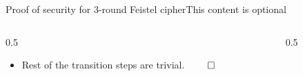 \ifdefined\PRESENTATION\else\PassOptionsToClass{handout}{beamer}\fi\documentclass[aspectratio=169, lualatex]{beamer}
\begin{document}
	\begin{frame}{Proof of security for 3-round Feistel cipher}{This content is optional}
		\begin{columns}[c]
			\begin{column}{0.5\textwidth}
				\begin{itemize}
					\item Rest of the transition steps are trivial. $\qed$
				\end{itemize}
			\end{column}
			\begin{column}{0.5\textwidth}
				\begin{center}
				\end{center}
			\end{column}
		\end{columns}
	\end{frame}
\fi
\end{document}
